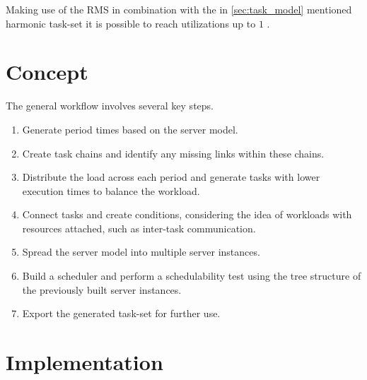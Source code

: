 Making use of the \ac{RMS} in combination with the in \cref{sec:task_model} mentioned harmonic task-set it is possible to reach utilizations up to $1$ \cite{liuSchedulingAlgorithmsMultiprogramming1973}.


\cite{dar-tzenpengAssignmentSchedulingCommunicating1997}


\section{Concept}
\label{sec:concept}
The general workflow involves several key steps. 
\begin{enumerate}
	\item Generate period times based on the server model.
	\item Create task chains and identify any missing links within these chains.
	\item Distribute the load across each period and generate tasks with lower execution times to balance the workload.
	\item Connect tasks and create conditions, considering the idea of workloads with resources attached, such as inter-task communication.
	\item Spread the server model into multiple server instances.
	\item Build a scheduler and perform a schedulability test using the tree structure of the previously built server instances.
	\item Export the generated task-set for further use.
\end{enumerate}








\section{Implementation}
\label{sec:implementation}



